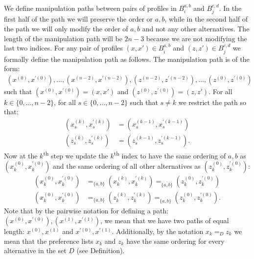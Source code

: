 	We define manipulation paths between pairs of profiles in $B^{a,b}_i$ and $B^{c,d}_j$. In the first half of the path we will preserve the order or $a, b$, while in the second half of the path we will only modify the order of $a, b$ and not any other alternatives. The length of the manipulation path will be $2n - 3$ because we are not modifying the last two indices. For any pair of profiles $(x, x') \in B^{a,b}_i$ and $(z, z') \in B^{c,d}_j$ we formally define the manipulation path as follows. The manipulation path is of the form:
	\begin{align*}
		(x^{(0)}, x^{\prime(0)}), \ldots, (x^{(n - 2)}, x^{\prime(n - 2)}), (z^{(n - 2)}, z^{\prime(n - 2)}), \ldots, (z^{(0)}, z^{\prime(0)})
	\end{align*}
	such that $(x^{(0)}, x^{\prime(0)}) = (x, x')$ and $(z^{(0)}, z^{\prime(0)}) = (z, z')$. For all $k \in \{0, \ldots, n - 2\}$, for all $s \in \{0, \ldots, n - 2\}$ such that $s \neq k$ we restrict the path so that:
	\begin{align}
		(x_s^{(k)}, x_s^{\prime(k)}) &= (x_s^{(k-1)}, x_s^{\prime(k-1)})  \\
		(z_s^{(k)}, z_s^{\prime(k)}) &= (z_s^{(k-1)}, z_s^{\prime(k-1)}).
	\end{align}
	Now at the $k$\textsuperscript{th} step we update the $k$\textsuperscript{th} index to have the same ordering of $a, b$ as $(x_k^{(0)}, x_k^{\prime(0)})$ and the same ordering of all other alternatives as $(z_k^{(0)}, z_k^{\prime(0)})$:
	\begin{align}
		(x_k^{(0)}, x_k^{\prime(0)}) &=_{\{a, b\}} (x_k^{(k)}, x_k^{\prime(k)}) =_{\overline{\{a, b\}}} (z_k^{(0)}, z_k^{\prime(0)}) \\
		(x_k^{(0)}, x_k^{\prime(0)}) &=_{\{a, b\}} (z_k^{(k)}, z_k^{\prime(k)}) =_{\overline{\{a, b\}}} (z_k^{(0)}, z_k^{\prime(0)}).
	\end{align}
	Note that by the pairwise notation for defining a path: $(x^{(0)}, x^{\prime(0)}), (x^{(1)}, x^{\prime(1)})$, we mean that we have two paths of equal length: $x^{(0)}, x^{(1)}$ and $x^{\prime(0)}, x^{\prime(1)}$. Additionally, by the notation $x_k =_D z_k$ we mean that the preference lists $x_k$ and $z_k$ have the same ordering for every alternative in the set $D$ (see Definition).

